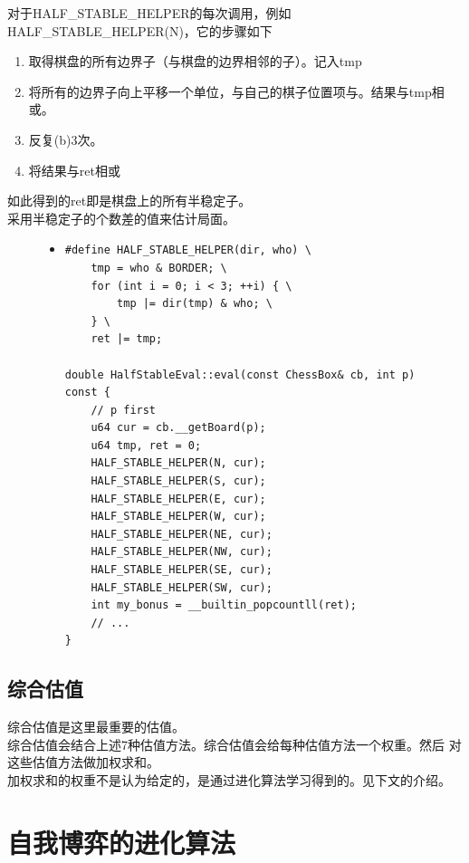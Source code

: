 \documentclass[a4paper]{article}
\begin{document}
对于HALF\_STABLE\_HELPER的每次调用，例如HALF\_STABLE\_HELPER(N)，它的步骤如下
\begin{enumerate}[label=(\alph*)]
    \item 取得棋盘的所有边界子（与棋盘的边界相邻的子）。记入tmp
    \item 将所有的边界子向上平移一个单位，与自己的棋子位置项与。结果与tmp相或。
    \item 反复(b)3次。
    \item 将结果与ret相或
\end{enumerate}
如此得到的ret即是棋盘上的所有半稳定子。\\

采用半稳定子的个数差的值来估计局面。

\begin{figure}[!hbt]
\begin{itemize}
\item[] \begin{lstlisting}[style=mycpp, label=lst:halfstable, caption=半稳定子的计算方式]
#define HALF_STABLE_HELPER(dir, who) \
    tmp = who & BORDER; \
    for (int i = 0; i < 3; ++i) { \
        tmp |= dir(tmp) & who; \
    } \
    ret |= tmp;

double HalfStableEval::eval(const ChessBox& cb, int p) const {
    // p first
    u64 cur = cb.__getBoard(p);
    u64 tmp, ret = 0;
    HALF_STABLE_HELPER(N, cur);
    HALF_STABLE_HELPER(S, cur);
    HALF_STABLE_HELPER(E, cur);
    HALF_STABLE_HELPER(W, cur);
    HALF_STABLE_HELPER(NE, cur);
    HALF_STABLE_HELPER(NW, cur);
    HALF_STABLE_HELPER(SE, cur);
    HALF_STABLE_HELPER(SW, cur);
    int my_bonus = __builtin_popcountll(ret);
    // ...
}
\end{lstlisting}
\end{itemize}
\end{figure}

\subsection{综合估值}\label{subsec:sum}
综合估值是这里最重要的估值。\\

综合估值会结合上述7种估值方法。综合估值会给每种估值方法一个权重。然后
对这些估值方法做加权求和。\\

加权求和的权重不是认为给定的，是通过进化算法学习得到的。见下文的介绍。

\section{自我博弈的进化算法}
\end{document}
